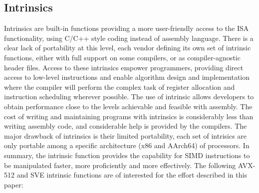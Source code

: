 \documentclass[5p,times,twocolumn]{elsarticle}
\begin{document}
\subsection{Intrinsics}
Intrinsics are built-in functions providing a more user-friendly access to the ISA functionality,
using C/C++ style coding instead of assembly language.
There is a clear lack of portability at this level, each vendor defining its own set of intrinsic functions, either with full support on some compilers, or as compiler-agnostic header files. Access to these intrinsics empower programmers, providing direct access to low-level instructions and enable algorithm design and implementation
where the compiler will perform the complex task of register allocation
and instruction scheduling wherever possible.
%
The use of intrinsic allows developers to obtain performance close to the levels achievable and feasible with assembly.
The cost of writing and maintaining programs with intrinsics is considerably less than writing assembly code, and considerable help is provided by the compilers.
The major drawback of intrinsics is their limited portability, each set of intrisics are only portable among a specific architecture (x86 and AArch64) of processors.
In summary, the intrinsic function provides the capability for SIMD instructions to be manipulated faster, more
proficiently and more effectively.
The following AVX-512 and SVE intrinsic functions are of interested for the effort described in this paper:
\end{document}
